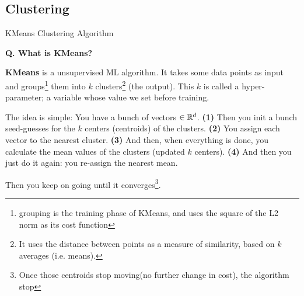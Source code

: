 
\subsection{Clustering}
\begin{transitionsubframe}
  \begin{center}
    \Huge KMeans Clustering Algorithm
  \end{center}
\end{transitionsubframe}


\begin{frame}[fragile]{\textbf{Q. What is KMeans?}}
  \begin{wideitemize}
  \item \textbf{KMeans} is a unsupervised ML algorithm. It takes some data
    points as input and groups\footnote{grouping is the training phase of KMeans,
      and uses the square of the L2 norm as its cost function} them into $k$
    clusters\footnote{It uses the distance between points as a measure of
      similarity, based on $k$ averages (i.e. means).} (the output).
    {\footnotesize This $k$ is called a hyper-parameter; a variable whose value we set
      before training.} \medskip
  \begin{wideitemize}
    \item The idea is simple: You have a bunch of vectors $\in {\Bbb R}^{d}$.
      \textbf{(1)} Then you init a bunch seed-guesses for the $k$ centers (centroids) of the
      clusters. \textbf{(2)} You assign each vector to the nearest cluster.
      \textbf{(3)} And then, when everything is done, you calculate the mean
      values of the clusters (updated $k$ centers). \textbf{(4)} And then you just do it
      again: you re-assign the nearest mean.
    \item Then you keep on going until it converges\footnote{Once those
        centroids stop moving(no further change in cost), the algorithm stop}.
  \end{wideitemize}
  \end{wideitemize}
\end{frame}

